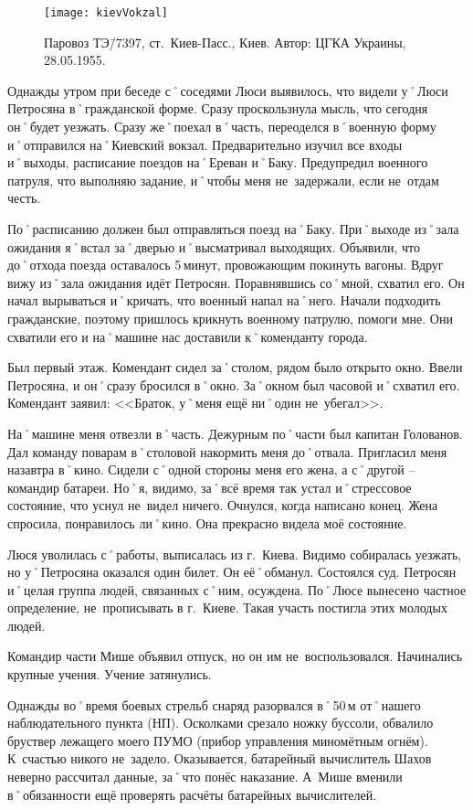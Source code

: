\begin{wrapfigure}{O}{.4\textwidth}
\centering
\texttt{[image: kievVokzal]}
\caption{Паровоз ТЭ\=/7397, ст.~Киев-Пасс., Киев. Автор: ЦГКА Украины, 28.05.1955.}
\label{fig:kievVokzal}
\end{wrapfigure}

Однажды утром при беседе с˚соседями Люси выявилось, что видели у˚Люси Петросяна в˚гражданской форме. Сразу проскользнула мысль, что сегодня он˚будет уезжать. Сразу же˚поехал в˚часть, переоделся в˚военную форму и˚отправился на˚Киевский вокзал. Предварительно изучил все входы и˚выходы, расписание поездов на˚Ереван и˚Баку. Предупредил военного патруля, что выполняю задание, и˚чтобы меня не~задержали, если не~отдам честь. 

По˚расписанию должен был отправляться поезд на˚Баку. При˚выходе из˚зала ожидания я˚встал за˚дверью и˚высматривал выходящих. Объявили, что до˚отхода поезда оставалось 5\,минут, провожающим покинуть вагоны. Вдруг вижу из˚зала ожидания идёт Петросян. Поравнявшись со˚мной, схватил его. Он начал вырываться и˚кричать, что военный напал на˚него. Начали подходить гражданские, поэтому пришлось крикнуть военному патрулю, помоги мне. Они схватили его и на˚машине нас доставили к˚коменданту города. 

Был первый этаж. Комендант сидел за˚столом, рядом было открыто окно. Ввели Петросяна, и он˚сразу бросился в˚окно. За˚окном был часовой и˚схватил его. Комендант заявил: <<Браток, у˚меня ещё ни˚один не~убегал>>. 

На˚машине меня отвезли в˚часть. Дежурным по˚части был капитан Голованов. Дал команду поварам в˚столовой накормить меня до˚отвала. Пригласил меня назавтра в˚кино. Сидели с˚одной стороны меня его жена, а с˚другой \--- командир батареи. Но˚я, видимо, за˚всё время так устал и˚стрессовое состояние, что уснул не~видел ничего. Очнулся, когда написано конец. Жена спросила, понравилось ли˚кино. Она прекрасно видела моё состояние. 

Люся уволилась с˚работы, выписалась из г.~Киева. Видимо собиралась уезжать, но у˚Петросяна оказался один билет. Он её˚обманул. Состоялся суд. Петросян и˚целая группа людей, связанных с˚ним, осуждена. По˚Люсе вынесено частное определение, не~прописывать в г.~Киеве. Такая участь постигла этих молодых людей.

Командир части Мише объявил отпуск, но он им не~воспользовался. Начинались крупные учения. Учение затянулись.

Однажды во˚время боевых стрельб снаряд разорвался в˚50\,м от˚нашего наблюдательного пункта (НП). Осколками срезало ножку буссоли, обвалило бруствер лежащего моего ПУМО (прибор управления миномётным огнём). К~счастью никого не~задело. Оказывается, батарейный вычислитель Шахов неверно рассчитал данные, за˚что понёс наказание. А~Мише вменили в˚обязанности ещё проверять расчёты батарейных вычислителей. 

